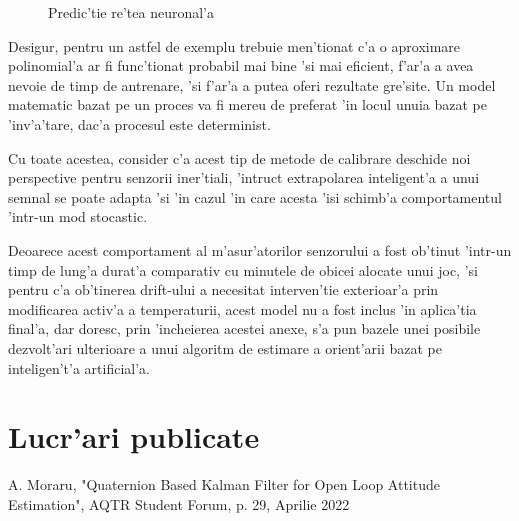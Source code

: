 \begin{figure}[h]
  \hspace*{-3.5cm}
  
  \caption{Predic'tie re'tea neuronal'a}
\end{figure}

Desigur, pentru un astfel de exemplu trebuie men'tionat c'a o aproximare polinomial'a ar fi func'tionat probabil mai bine 'si mai eficient, f'ar'a a avea nevoie de timp de antrenare, 'si f'ar'a a putea oferi rezultate gre'site. Un model matematic bazat pe un proces va fi mereu de preferat 'in locul unuia bazat pe 'inv'a'tare, dac'a procesul este determinist.

\vspace{5px}

Cu toate acestea, consider c'a acest tip de metode de calibrare deschide noi perspective pentru senzorii iner'tiali, 'intruc\ia t extrapolarea inteligent'a a unui semnal se poate adapta 'si 'in cazul 'in care acesta 'isi schimb'a comportamentul 'intr-un mod stocastic.

\vspace{5px}

Deoarece acest comportament al m'asur'atorilor senzorului a fost ob'tinut 'intr-un timp de lung'a durat'a comparativ cu minutele de obicei alocate unui joc, 'si pentru c'a ob'tinerea drift-ului a necesitat interven'tie exterioar'a prin modificarea activ'a a temperaturii, acest model nu a fost inclus 'in aplica'tia final'a, dar doresc, prin 'incheierea acestei anexe, s'a pun bazele unei posibile dezvolt'ari ulterioare a unui algoritm de estimare a orient'arii bazat pe inteligen't'a artificial'a.



\chapter{Lucr'ari publicate}

A. Moraru, "Quaternion Based Kalman Filter for Open Loop Attitude Estimation", AQTR Student Forum, p. 29, Aprilie 2022